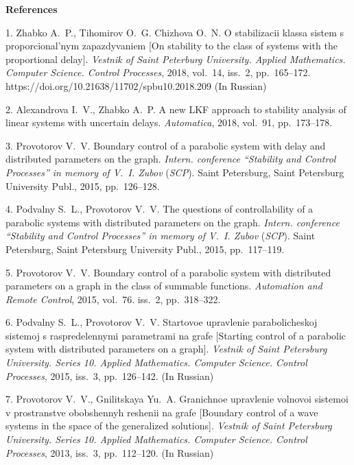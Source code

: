 

{\small



\vskip6mm

\noindent \textbf{References} }

\vskip 2mm

{\footnotesize

1. Zhabko A.~P., Tihomirov O.~G. Chizhova O.~N. O stabilizacii
klassa sistem s proporcional'nym zapazdyvaniem [On stability to
the class of systems with the proportional delay]. \emph{Vestnik
of Saint Peterburg University. Applied Mathematics. Computer
Science. Control Processes}, 2018, vol.~14, iss.~2, pp.~165--172.
https://doi.org/10.21638/11702/spbu10.2018.209 (In Russian)

2. Alexandrova I.~V., Zhabko A.~P.  A new LKF approach to
stability analysis of linear systems with uncertain delays.
\emph{Automatica}, 2018, vol.~91, pp.~173--178.

3. Provotorov V.~V. Boundary control of a parabolic system with
delay and distributed parameters on the graph.  \emph{Intern.
conference ``Stability and Control Processes'' in memory of V.~I.
Zubov} (\emph{SCP}). Saint Petersburg, Saint Petersburg University
Publ., 2015, pp.~126--128.

4. Podvalny S.~L., Provotorov V.~V. The questions of
controllability of a parabolic systems with distributed parameters
on the graph. \emph{Intern. conference ``Stability and Control
Processes'' in memory of V.~I. Zubov} (\emph{SCP}). Saint
Petersburg, Saint Petersburg University Publ., 2015, pp.~117--119.

5. Provotorov V.~V. Boundary control of a parabolic system with
distributed parameters on a graph in the class of summable
functions. \emph{Automation and Remote Control}, 2015, vol.~76.
iss.~2, pp.~318--322.

6. Podvalny S.~L., Provotorov V.~V. Startovoe upravlenie
parabolicheskoj sistemoj s raspredelennymi parametrami na grafe
[Starting control of a parabolic system with distributed
parameters on a graph]. \textit{Vestnik of Saint Petersburg
University. Series 10. Applied Mathematics. Computer Science.
Control Processes}, 2015, iss.~3, pp.~126--142. (In Russian)

7. Provotorov V.~V.,  Gnilitskaya Yu.~A. Granichnoe upravlenie
volnovoi sistemoi v prostranstve obobshennyh reshenii na grafe
[Boundary control of a wave systems in the space of the
generalized solutions]. \textit{Vestnik of Saint Petersburg
University. Series 10. Applied Mathematics. Computer Science.
Control Processes}, 2013, iss.~3, pp.~112--120. (In Russian)


}
